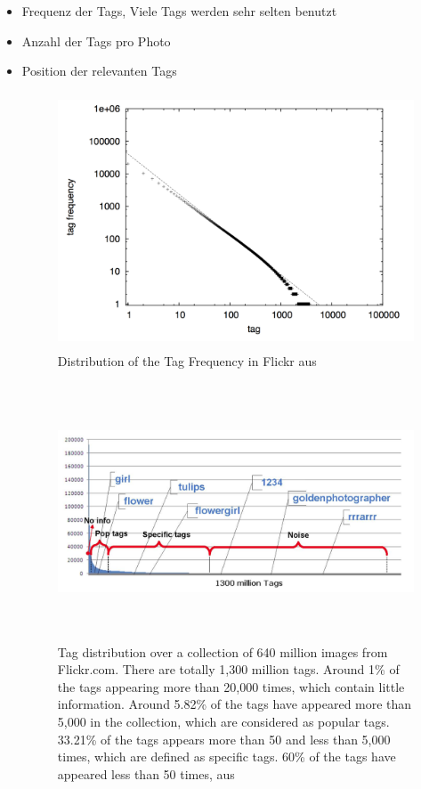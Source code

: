  \begin{itemize}
  \item Frequenz der Tags, Viele Tags werden sehr selten benutzt
  \item Anzahl der Tags pro Photo
  \item Position der relevanten Tags
 \begin{figure}[htbp]
    \centering
      \includegraphics[height=3in]{images/collectiveKnowledge_tag_frequency.png}
    \caption{Distribution of the Tag Frequency in Flickr aus \cite{collectiveKnowledge}}
    \label{fig:images_collectiveKnowledge_word_net_categories}
  \end{figure}
  
  \begin{figure}[htbp]
    \centering
      \includegraphics[height=3in]{images/learning_to_tag_frequency.png}
    \caption{Tag distribution over a collection of 640 million images from Flickr.com. There are totally 1,300 million tags. Around 1\% of the tags appearing more than 20,000 times, which contain little information. Around 5.82\% of the tags have appeared more than 5,000 in the collection, which are considered as popular tags. 33.21\% of the tags appears more than 50 and less than 5,000 times, which are defined as specific tags. 60\% of the tags have appeared less than 50 times, aus \cite{learningToTag}}
    \label{fig:images_learning_to_tag_frequency}
  \end{figure}
  

\end{itemize}
